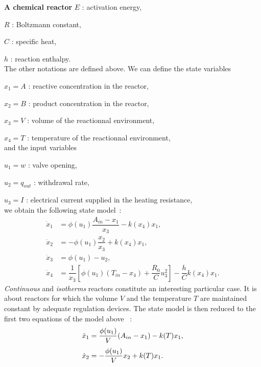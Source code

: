 \begin{exemple}{\bf  A chemical reactor }
$E$ : activation energy,

$R$ : Boltzmann constant,

$C$ : specific heat,

$h$ : reaction enthalpy.\\

\noindent The other notations are defined above. We can define the state variables

$x_1 = A$ : reactive concentration in the reactor,

$x_2 = B$ : product concentration in the reactor,

$x_3 = V$ : volume of the reactionnal environment,

$x_4 = T$ : temperature of the reactionnal environment,\\

\noindent and the input variables

$u_1 = w$ : valve opening,

$u_2 = q_{out}$ : withdrawal rate,

$u_3 = I$ : electrical current supplied in the heating resistance,\\

\noindent we obtain the following state model~:
\begin{equation*} \begin{split} 
\dot x_1 &= \phi(u_1)\dfrac{{\textstyle A_{in} - x_1}}{{\textstyle x_3}} - k(x_4)x_1,\\[0.3em]
\dot x_2 &= - \phi(u_1) \dfrac{x_2}{x_3} + k(x_4)x_1,\\[0.3em]
\dot x_3 &= \phi(u_1) - u_2, \\[0.3em]
\dot x_4 &= \dfrac{{1}}{{x_3}}[\phi(u_1)(T_{in} - x_4) + \dfrac{{R_0}}{{C}}u_3^2] - \dfrac{{h}}{{C}}k(x_4)x_1.
\end{split} \end{equation*}
{\it Continuous} and {\it isotherms} reactors constitute an interesting particular case. It is about reactors for which the volume $V$ and the temperature $T$ are maintained constant by adequate regulation devices. The state model is then reduced to the first two equations of the model above ~:
\begin{equation} \begin{split} \label{iso}
\dot x_1 &= \dfrac{\phi(u_1)}{{V}} (A_{in} - x_1) - k(T)x_1, \\[0.3em]
\dot x_2 &= - \dfrac{\phi(u_1)}{{V}} x_2 + k(T)x_1.  \xqedhere{4.8cm}{\qed}
\end{split} \end{equation}
\end{exemple}
\vv


